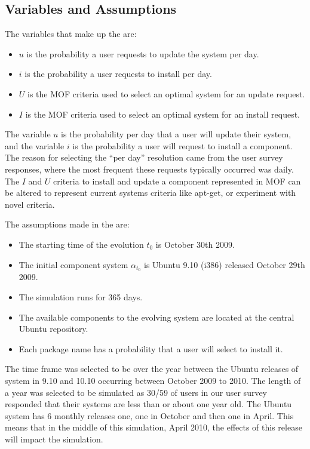 \subsection{Variables and Assumptions}
The variables that make up the \usermodel are: 
\begin{itemize}
  \item $u$ is the probability a user requests to update the system per day.
  \item $i$ is the probability a user requests to install per day.
  \item $U$ is the MOF criteria used to select an optimal system for an update request.
  \item $I$ is the MOF criteria used to select an optimal system for an install request.
\end{itemize}

The variable $u$ is the probability per day that a user will update their system, and the variable $i$ is the probability a user will request to install a component.
The reason for selecting the ``per day'' resolution came from the user survey responses, where the most frequent these requests typically occurred was daily.
The $I$ and $U$ criteria to install and update a component represented in MOF can be altered to represent current systems criteria like apt-get,
or experiment with novel criteria.

The assumptions made in the \usermodel are:
\begin{itemize}
  \item The starting time of the evolution $t_0$ is October 30th 2009.
  \item The initial component system $\alpha_{t_0}$ is Ubuntu 9.10 (i386) released October 29th 2009.
  \item The simulation runs for 365 days.
  \item The available components to the evolving system are located at the central Ubuntu repository.
  \item Each package name has a probability that a user will select to install it. 
\end{itemize}

The time frame was selected to be over the year between the Ubuntu releases of system in 9.10 and 10.10 occurring between October 2009 to 2010.
The length of a year was selected to be simulated as 30/59 of users in our user survey responded that their systems are less than or about one year old.
The Ubuntu system has 6 monthly releases one, one in October and then one in April.
This means that in the middle of this simulation, April 2010, the effects of this release will impact the simulation.

